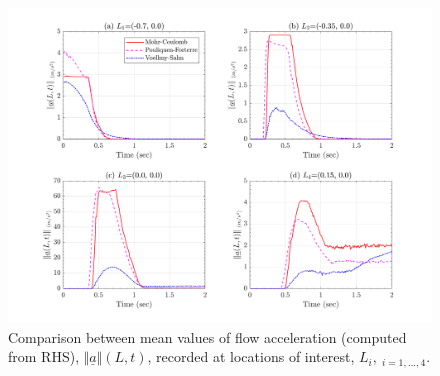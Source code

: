 \documentclass{article}
\begin{document}
\begin{figure}[H]
        \centering
        \includegraphics[width=1\textwidth]{InclinedPlane/Acceleration/accel_meanR.png}
        \caption{Comparison between mean values of flow acceleration (computed from RHS), $\Vert \underline{a} \Vert(L,t)$, recorded at locations of interest, $L_i, \ _{i=1,...,4}$.}
        \label{fig:Ramp-LM-AccR-means}
\end{figure}
\end{document}
